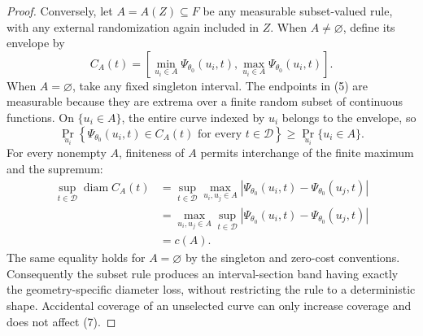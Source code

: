 \documentclass{article}
\begin{document}
\begin{proof}
Conversely, let \(A=A(Z)\subseteq F\) be any measurable subset-valued rule, with any external randomization again included in \(Z\).  When \(A\ne\varnothing\), define its envelope by
\[
 C_A(t)=
 \left[
   \min_{u_i\in A}\Psi_{\theta_0}(u_i,t),
   \max_{u_i\in A}\Psi_{\theta_0}(u_i,t)
 \right].
\tag{5}
\]
When \(A=\varnothing\), take any fixed singleton interval.  The endpoints in (5) are measurable because they are extrema over a finite random subset of continuous functions.  On \(\{u_i\in A\}\), the entire curve indexed by \(u_i\) belongs to the envelope, so
\[
 \Pr_{u_i}\!\left\{
   \Psi_{\theta_0}(u_i,t)\in C_A(t)
   \text{ for every }t\in\mathcal D\right\}
 \geq \Pr_{u_i}\{u_i\in A\}.
\tag{6}
\]
For every nonempty \(A\), finiteness of \(A\) permits interchange of the finite maximum and the supremum:
\[
\begin{aligned}
 \sup_{t\in\mathcal D}\operatorname{diam}C_A(t)
 &=\sup_{t\in\mathcal D}\max_{u_i,u_j\in A}
   \left|\Psi_{\theta_0}(u_i,t)-\Psi_{\theta_0}(u_j,t)\right|\\
 &=\max_{u_i,u_j\in A}\sup_{t\in\mathcal D}
   \left|\Psi_{\theta_0}(u_i,t)-\Psi_{\theta_0}(u_j,t)\right|\\
 &=c(A).
\end{aligned}
\tag{7}
\]
The same equality holds for \(A=\varnothing\) by the singleton and zero-cost conventions.  Consequently the subset rule produces an interval-section band having exactly the geometry-specific diameter loss, without restricting the rule to a deterministic shape.  Accidental coverage of an unselected curve can only increase coverage and does not affect (7).


\end{proof}
\end{document}
